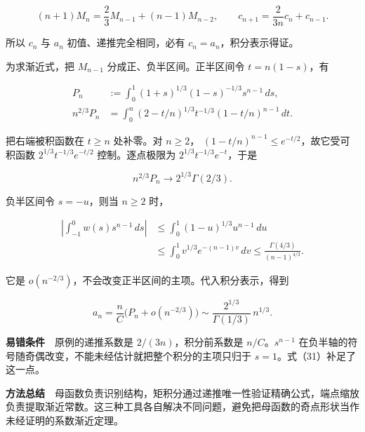 \documentclass[11pt,a4paper]{article}
\begin{document}
\begin{equation}
(n+1)M_n=\frac23M_{n-1}+(n-1)M_{n-2},
\qquad c_{n+1}=\frac{2}{3n}c_n+c_{n-1}.
\tag{28}
\end{equation}

所以 \(c_n\) 与 \(a_n\) 初值、递推完全相同，必有
\(c_n=a_n\)，积分表示得证。

为求渐近式，把 \(M_{n-1}\) 分成正、负半区间。正半区间令 \(t=n(1-s)\)，有

\begin{equation}
\begin{aligned}
P_n&:=\int_0^1(1+s)^{1/3}(1-s)^{-1/3}s^{n-1}\,ds,\\
n^{2/3}P_n
&=\int_0^n(2-t/n)^{1/3}t^{-1/3}(1-t/n)^{n-1}\,dt.
\end{aligned}
\tag{29}
\end{equation}

把右端被积函数在 \(t\ge n\) 处补零。对 \(n\ge2\)，
\((1-t/n)^{n-1}\le e^{-t/2}\)，故它受可积函数
\(2^{1/3}t^{-1/3}e^{-t/2}\) 控制。逐点极限为
\(2^{1/3}t^{-1/3}e^{-t}\)，于是

\begin{equation}
n^{2/3}P_n\longrightarrow2^{1/3}\Gamma(2/3).
\tag{30}
\end{equation}

负半区间令 \(s=-u\)，则当 \(n\ge2\) 时，

\begin{equation}
\begin{aligned}
\left|\int_{-1}^0w(s)s^{n-1}\,ds\right|
&\le\int_0^1(1-u)^{1/3}u^{n-1}\,du\\
&\le\int_0^1v^{1/3}e^{-(n-1)v}\,dv
\le\frac{\Gamma(4/3)}{(n-1)^{4/3}}.
\end{aligned}
\tag{31}
\end{equation}

它是 \(o(n^{-2/3})\)，不会改变正半区间的主项。代入积分表示，得到

\begin{equation}
a_n=\frac nC\big(P_n+o(n^{-2/3})\big)
\sim\frac{2^{1/3}}{\Gamma(1/3)}\,n^{1/3}.
\tag{32}
\end{equation}

\textbf{易错条件}　原例的递推系数是 \(2/(3n)\)，积分前系数是
\(n/C\)。\(s^{n-1}\)
在负半轴的符号随奇偶改变，不能未经估计就把整个积分的主项只归于
\(s=1\)。式（31）补足了这一点。

\textbf{方法总结}　母函数负责识别结构，矩积分通过递推唯一性验证精确公式，端点缩放负责提取渐近常数。这三种工具各自解决不同问题，避免把母函数的奇点形状当作未经证明的系数渐近定理。
\end{document}
